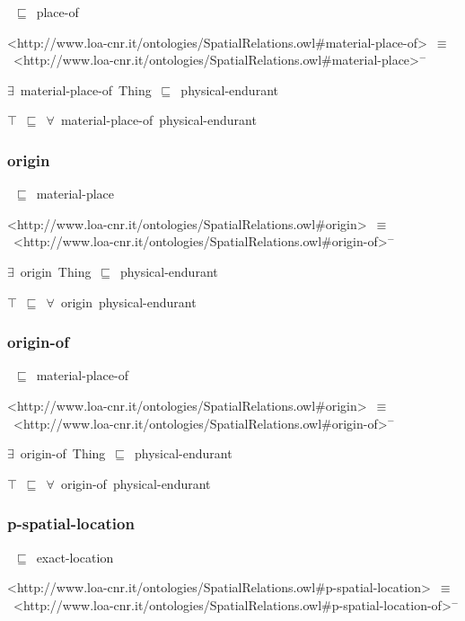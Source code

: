 \documentclass{article}
\begin{document}
~\ensuremath{\sqsubseteq}~place-of

<http://www.loa-cnr.it/ontologies/SpatialRelations.owl#material-place-of>~\ensuremath{\equiv}~<http://www.loa-cnr.it/ontologies/SpatialRelations.owl#material-place>\ensuremath{^-}

\ensuremath{\exists}~material-place-of~Thing~\ensuremath{\sqsubseteq}~physical-endurant

\ensuremath{\top}~\ensuremath{\sqsubseteq}~\ensuremath{\forall}~material-place-of~physical-endurant

\subsubsection*{origin}

~\ensuremath{\sqsubseteq}~material-place

<http://www.loa-cnr.it/ontologies/SpatialRelations.owl#origin>~\ensuremath{\equiv}~<http://www.loa-cnr.it/ontologies/SpatialRelations.owl#origin-of>\ensuremath{^-}

\ensuremath{\exists}~origin~Thing~\ensuremath{\sqsubseteq}~physical-endurant

\ensuremath{\top}~\ensuremath{\sqsubseteq}~\ensuremath{\forall}~origin~physical-endurant

\subsubsection*{origin-of}

~\ensuremath{\sqsubseteq}~material-place-of

<http://www.loa-cnr.it/ontologies/SpatialRelations.owl#origin>~\ensuremath{\equiv}~<http://www.loa-cnr.it/ontologies/SpatialRelations.owl#origin-of>\ensuremath{^-}

\ensuremath{\exists}~origin-of~Thing~\ensuremath{\sqsubseteq}~physical-endurant

\ensuremath{\top}~\ensuremath{\sqsubseteq}~\ensuremath{\forall}~origin-of~physical-endurant

\subsubsection*{p-spatial-location}

~\ensuremath{\sqsubseteq}~exact-location

<http://www.loa-cnr.it/ontologies/SpatialRelations.owl#p-spatial-location>~\ensuremath{\equiv}~<http://www.loa-cnr.it/ontologies/SpatialRelations.owl#p-spatial-location-of>\ensuremath{^-}
\end{document}

